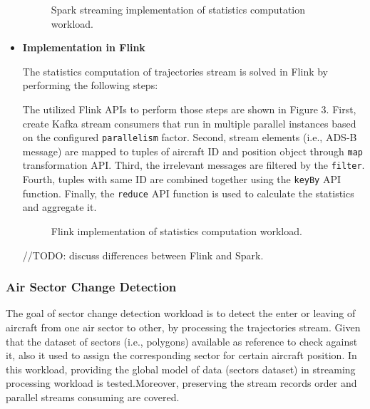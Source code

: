 \documentclass[]{article}
\begin{document}
\begin{itemize}
\begin{figure}[h]
 
  \centering
  
     \caption{Spark streaming implementation of statistics computation workload.}
\end{figure} 

\item {\bf{Implementation in Flink }}

The statistics computation of trajectories stream is solved in Flink by performing the following steps: 

\par The utilized Flink APIs to perform those steps are shown in Figure 3. First, create Kafka stream consumers that run in multiple parallel instances based on the configured \texttt{parallelism} factor. Second,  stream elements (i.e., ADS-B message) are mapped  to tuples of aircraft ID and  position object through \texttt{map} transformation API. Third, the irrelevant messages are filtered by the \texttt{filter}. Fourth, tuples with same ID are combined together using the \texttt{keyBy} API function. Finally, the \texttt{reduce} API function is used to calculate the statistics and aggregate it.

\begin{figure}[h]
 
  \centering
  
     \caption{Flink implementation of statistics computation workload.}
\end{figure}


//TODO: discuss differences between Flink and Spark.

\end{itemize}

\subsubsection{Air Sector Change Detection}

The goal of sector change detection workload is to detect the  enter or leaving of aircraft from one air sector to other, by processing the trajectories stream. Given that the dataset of sectors (i.e., polygons) available as reference to check against it, also it used to assign the corresponding sector for certain aircraft position. In this workload, providing the  global model of data (sectors dataset) in streaming processing workload is tested.Moreover, preserving the stream records order and parallel streams consuming are covered.
 
\end{document}
